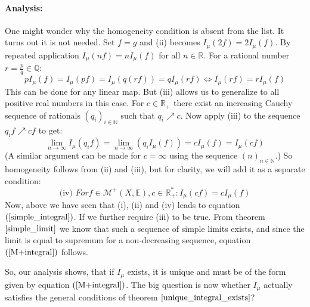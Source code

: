 \documentclass[12pt, a4paper]{article}
\numberwithin{equation}{section}
\begin{document}
\paragraph{Analysis:}
One might wonder why the homogeneity condition is absent from the list. It turns out it is not needed. Set $f=g$ and (ii) becomes $I_\mu(2f)=2 I_\mu(f)$. By repeated application $I_\mu(nf)=n I_\mu(f)$ for all $n\in\mathbb{R}$. For a rational number $r=\frac{p}{q}\in\mathbb{Q}$:
\begin{equation}
p I_\mu(f)=I_\mu(pf)=I_\mu(q(rf))=q I_\mu(rf)\Leftrightarrow I_\mu(rf)=r I_\mu(f)
\end{equation}
This can be done for any linear map. But (iii) allows us to generalize to all positive real numbers in this case. For $c\in\mathbb{R}_+$ there exist an increasing Cauchy sequence of rationals $(q_i)_{i\in\mathbb{N}}$ such that $q_i\nearrow c$. Now apply (iii) to the sequence $q_i f\nearrow c f$ to get:
\begin{equation}
\underset{n\rightarrow\infty}{\lim}I_\mu(q_i f)=\underset{n\rightarrow\infty}{\lim}\left(q_i I_\mu(f)\right)=c I_\mu(f)=I_\mu(c f)
\end{equation}
(A similar argument can be made for $c=\infty$ using the sequence $(n)_{n\in\mathbb{N}}$.) So homogeneity follows from (ii) and (iii), but for clarity, we will add it as a separate condition:
\begin{equation}
\label{lebesgue_integral_homogeneity}
\textrm{(iv) }For f\in\mathcal{M}^+(X,\mathbb{E}), c\in\mathbb{R}^*_+: I_\mu(c f)=c I_\mu(f)
\end{equation}
Now, above we have seen that (i), (ii) and (iv) leads to equation $(\ref{simple_integral})$. If we further require (iii) to be true. From theorem $\ref{simple_limit}$ we know that such a sequence of simple limits exists, and since the limit is equal to supremum for a non-decreasing sequence, equation $(\ref{M+integral})$ follows.

So, our analysis shows, that if $I_\mu$ exists, it is unique and must be of the form given by equation $(\ref{M+integral})$. The big question is now whether $I_\mu$ actually satisfies the general conditions of theorem $\ref{unique_integral_exists}$?
\end{document}
